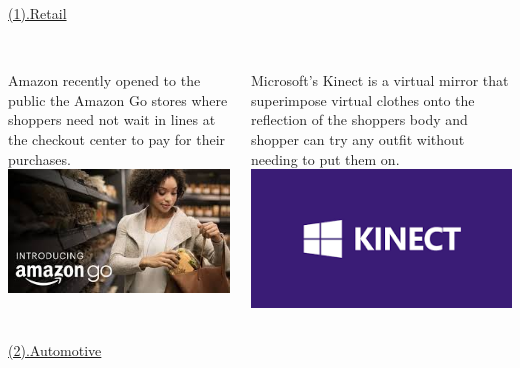 \documentclass{beamer}
\begin{document}
{{\begin{frame}[t]{\underline{(1).Retail}}
\begin{columns}[t]
\begin{column}{5cm}
		\\
\small{Amazon recently opened to the public the Amazon Go stores where shoppers need not wait in lines at the checkout center to pay for their purchases.\\}
		\href{run:Amazon Go.mp4}{\includegraphics[scale=.4]{amazongo.jpg}}
		
	\end{column}
\pause
\begin{column}{5cm}
	\\
\small{Microsoft's Kinect is a virtual mirror that superimpose virtual clothes onto the reflection of the shoppers body and shopper can try any outfit without needing to put them on.}\\
		\href{run:Kinect.mp4}{\includegraphics[scale=.4]{kinect.png}}

\end{column}
\end{columns}
\end{frame}
}
{
\begin{frame}[t]{\underline{(2).Automotive}}

\begin{block}
	
\color{green}{By Computer Vision \& AI scientist are trying to make full automotive cars which are more secure \& then any reliable transport.}


\end{block}
\end{frame}}}
\end{document}
